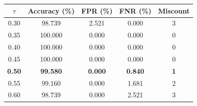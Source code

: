 \begin{tabular}{ccccc}
\toprule
$\tau$ & Accuracy (\%) & FPR (\%) & FNR (\%) & Miscount \\
\midrule
0.30 & 98.739 & 2.521 & 0.000 & 3 \\
0.35 & 100.000 & 0.000 & 0.000 & 0 \\
0.40 & 100.000 & 0.000 & 0.000 & 0 \\
0.45 & 100.000 & 0.000 & 0.000 & 0 \\
\textbf{0.50} & \textbf{99.580} & \textbf{0.000} & \textbf{0.840} & \textbf{1} \\
0.55 & 99.160 & 0.000 & 1.681 & 2 \\
0.60 & 98.739 & 0.000 & 2.521 & 3 \\
\bottomrule
\end{tabular}
